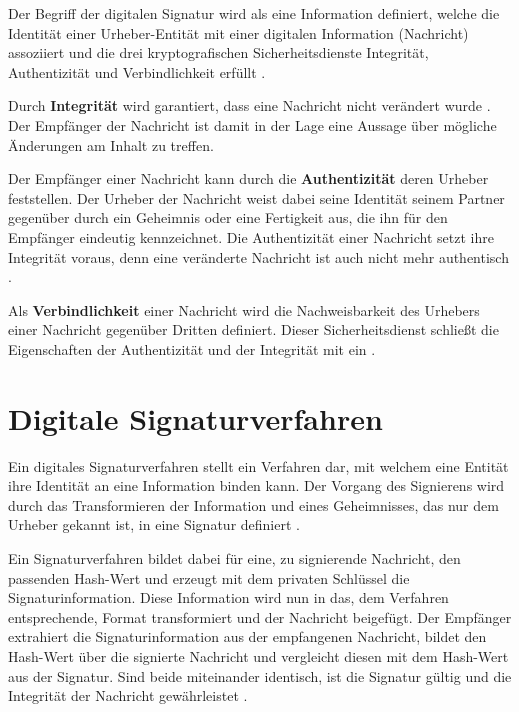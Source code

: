Der Begriff der digitalen Signatur wird als eine Information definiert, welche die Identität einer Urheber-Entität mit einer digitalen Information (Nachricht)
assoziiert und die drei kryptografischen Sicherheitsdienste Integrität, Authentizität und Verbindlichkeit erfüllt \cite{hac}.

\label{sec:GrundlagenDefinitionen:DigitaleSignaturen:Integrität}
Durch \textbf{Integrität} wird garantiert, dass eine Nachricht nicht verändert wurde \cite{niag}. Der Empfänger der Nachricht ist damit in der Lage eine Aussage über
mögliche Änderungen am Inhalt zu treffen.

\label{sec:GrundlagenDefinitionen:DigitaleSignaturen:Authentizität}
Der Empfänger einer Nachricht kann durch die \textbf{Authentizität} deren Urheber feststellen. Der Urheber der Nachricht weist dabei seine Identität seinem
Partner gegenüber durch ein Geheimnis oder eine Fertigkeit aus, die ihn für den Empfänger eindeutig kennzeichnet. Die Authentizität einer Nachricht setzt ihre
Integrität voraus, denn eine veränderte Nachricht ist auch nicht mehr authentisch \cite{kits}.

\label{sec:GrundlagenDefinitionen:DigitaleSignaturen:Verbindlichkeit}
Als \textbf{Verbindlichkeit} einer Nachricht wird die Nachweisbarkeit des Urhebers einer Nachricht gegenüber Dritten definiert. Dieser Sicherheitsdienst schließt die
Eigenschaften der Authentizität und der Integrität mit ein \cite{kits}.

\section{Digitale Signaturverfahren}
\label{sec:GrundlagenDefinitionen:DigitaleSignaturen:Verfahren}
Ein digitales Signaturverfahren stellt ein Verfahren dar, mit welchem eine Entität ihre Identität an eine Information binden kann. Der Vorgang des Signierens
wird durch das Transformieren der Information und eines Geheimnisses, das nur dem Urheber gekannt ist, in eine Signatur definiert \cite{hac}.

Ein Signaturverfahren bildet dabei für eine, zu signierende Nachricht, den passenden Hash-Wert und erzeugt mit dem privaten Schlüssel die Signaturinformation.
Diese Information wird nun in das, dem Verfahren entsprechende, Format transformiert und der Nachricht beigefügt.
Der Empfänger extrahiert die Signaturinformation aus der empfangenen Nachricht, bildet den Hash-Wert über die signierte Nachricht und vergleicht diesen mit dem
Hash-Wert aus der Signatur. Sind beide miteinander identisch, ist die Signatur gültig und die Integrität der Nachricht gewährleistet \cite{hac,singh:messages}.

